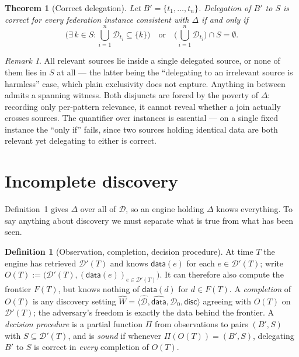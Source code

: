 \documentclass[11pt,a4paper]{article}
\theoremstyle{definition}
\newtheorem{definition}{Definition}
\theoremstyle{plain}
\newtheorem{theorem}{Theorem}
\theoremstyle{remark}
\newtheorem*{remark}{Remark}
\newcommand{\Dd}{\mathcal{D}}
\newcommand{\dataf}{\mathsf{data}}
\newcommand{\disc}{\mathsf{disc}}
\begin{document}
\begin{theorem}[Correct delegation]
Let $B' = \{t_1,\dots,t_n\}$. Delegation of $B'$ to $S$ is correct for every federation
instance consistent with $\Delta$ if and only if
\[
  \Big( \exists\, k \in S : \bigcup_{i=1}^{n} \Dd_{t_i} \subseteq \{k\} \Big)
  \quad\text{or}\quad
  \Big( \bigcup_{i=1}^{n} \Dd_{t_i} \Big) \cap S = \emptyset .
\]
\end{theorem}

\begin{remark}
All relevant sources lie inside a single delegated source, or none of them lies in $S$
at all --- the latter being the ``delegating to an irrelevant source is harmless'' case,
which plain exclusivity does not capture. Anything in between admits a spanning witness.
Both disjuncts are forced by the poverty of $\Delta$: recording only per-pattern
relevance, it cannot reveal whether a join actually crosses sources. The quantifier over
instances is essential --- on a single fixed instance the ``only if'' fails, since two
sources holding identical data are both relevant yet delegating to either is correct.
\end{remark}

\section{Incomplete discovery}
\label{sec:incomplete}

Definition~1 gives $\Delta$ over all of $\Dd$, so an engine holding $\Delta$ knows
everything. To say anything about discovery we must separate what is true from what has
been seen.

\begin{definition}[Observation, completion, decision procedure]
\label{def:obs}
At time $T$ the engine has retrieved $\Dd'(T)$ and knows $\dataf(e)$ for each
$e \in \Dd'(T)$; write $O(T) := \bigl( \Dd'(T), (\dataf(e))_{e \in \Dd'(T)} \bigr)$. It
can therefore also compute the frontier $F(T)$, but knows nothing of $\dataf(d)$ for
$d \in F(T)$. A \emph{completion} of $O(T)$ is any discovery setting
$\widehat{W} = \langle \widehat{\Dd}, \widehat{\dataf}, \Dd_0, \disc \rangle$ agreeing
with $O(T)$ on $\Dd'(T)$; the adversary's freedom is exactly the data behind the
frontier. A \emph{decision procedure} is a partial function $\Pi$ from observations to
pairs $(B', S)$ with $S \subseteq \Dd'(T)$, and is \emph{sound} if whenever
$\Pi(O(T)) = (B', S)$, delegating $B'$ to $S$ is correct in \emph{every} completion
of $O(T)$.
\end{definition}
\end{document}
